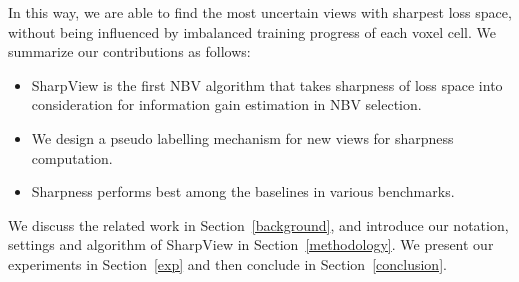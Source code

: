 In this way, we are able to find the most uncertain views with sharpest loss space, without being influenced by imbalanced training progress of each voxel cell.
We summarize our contributions as follows:
\begin{itemize}
    \item SharpView is the first NBV algorithm that takes sharpness of loss space into consideration for information gain estimation in NBV selection.
    \item We design a pseudo labelling mechanism for new views for sharpness computation.
    \item Sharpness performs best among the baselines in various benchmarks.
\end{itemize}

We discuss the related work in Section~\ref{background}, and introduce our notation, settings and algorithm of SharpView in Section~\ref{methodology}.
We present our experiments in Section~\ref{exp} and then conclude in Section~\ref{conclusion}.






